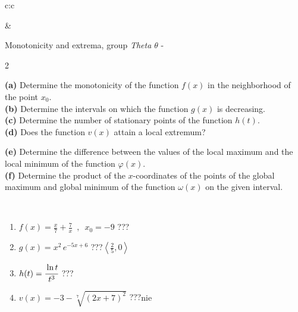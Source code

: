\documentclass[10pt]{report}
\begin{document}
\begin{tabular}{c:c}
\begin{minipage}[c][104.5mm][t]{0.5\linewidth}
\begin{center}
\end{center}
\end{minipage}
&
\begin{minipage}[c][104.5mm][t]{0.5\linewidth}
\begin{center}
\vspace{5mm}
{\huge Monotonicity and extrema, group \textit{Theta $\theta$} -}\\[5mm]
\begin{minipage}{0.95\linewidth}
\begin{center}
{\small \begin{multicols}{2} \raggedright
\textbf{(a)} Determine the monotonicity of the function \(f(x)\) in the neighborhood of the point \(x_0\). \\[1mm]
\textbf{(b)} Determine the intervals on which the function \(g(x)\) is decreasing. \\[1mm]
\textbf{(c)} Determine the number of stationary points of the function \(h(t)\). \\[1mm]
\textbf{(d)} Does the function \(v(x)\) attain a local extremum? \par \columnbreak
\textbf{(e)} Determine the difference between the values of the local maximum and the local minimum of the function \(\varphi(x)\). \\[1mm]
\textbf{(f)} Determine the product of the \(x\)-coordinates of the points of the global maximum and global minimum of the function \(\omega(x)\) on the given interval. \\[1mm]
\end{multicols}
}
\end{center}
\end{minipage}
\\[1mm]
\begin{minipage}{0.79\linewidth}
\begin{center}
\begin{varwidth}{\linewidth}
\setlength{\itemsep}{0pt}
\begin{enumerate}
\normalsize
\item $f(x)=\frac{x}{7}+\frac{7}{x} \enspace , \enspace x_0=-9$\quad \dotfill\; ???\;\dotfill \quad {}
\item $g(x)=x^2\, e^{-5x+6}$\quad \dotfill\; ???\;\dotfill \quad $\left\langle\frac{2}{5} , 0\right\rangle$
\item $h(t)=\cfrac{\ln t}{t^3}$\quad \dotfill\; ???\;\dotfill {}
\item $v(x)=-3-\sqrt[7]{(2x+7)^2}$\quad \dotfill\; ???\;\dotfill \quad $\text{nie}$

\end{enumerate}
\end{varwidth}
\end{center}
\end{minipage}
\end{center}
\end{minipage}
\end{tabular}
\end{document}

